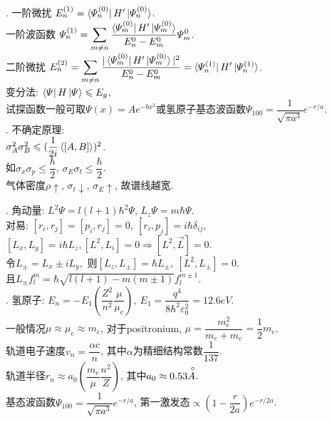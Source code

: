 \documentclass[12pt, 
]{article}
\begin{document}
. 一阶微扰 $E_n^{(1)}=\bra{\varPsi_n^{(0)}}H'\ket{\varPsi_n^{(0)}}$.
~\\\phantom{~~~~}一阶波函数 $\varPsi_n^{(1)}=\displaystyle\sum_{m\not = n}\dfrac{\bra{\varPsi_m^{(0)}}H'\ket{\varPsi_m^{(0)}}}{E_n^0-E_m^0}\varPsi_m^0$.
~\\\phantom{~~~~}二阶微扰 $E_n^{(2)}=\displaystyle\sum_{m\not = n}\dfrac{|\bra{\varPsi_m^{(0)}}H'\ket{\varPsi_m^{(0)}}|^2}{E_n^0-E_m^0}=\bra{\varPsi_n^{(1)}}H'\ket{\varPsi_n^{(1)}}$.
~\\\phantom{~~~~}变分法: $\bra{\varPsi}H\ket{\varPsi}\leqslant E_g$, 
~\\\phantom{~~~~}试探函数一般可取$\varPsi(x)=Ae^{-bx^2}$或氢原子基态波函数$\varPsi_{100}=\dfrac{1}{\sqrt{\pi a^3}}e^{-r/a}$.
~\\

. 不确定原理:
~\\\phantom{~~~~~~~~~~}$\sigma_A^2\sigma_B^2\leqslant(\dfrac{1}{2i}\braket{[A,B]})^2$.
~\\\phantom{~~~~~~~~~~}如$\sigma_x\sigma_p\leqslant\dfrac{\hbar}{2}$, $\sigma_E\sigma_t\leqslant\dfrac{\hbar}{2}$.
~\\\phantom{~~~~~~~~~~}气体密度$\rho\uparrow$, $\sigma_t\downarrow$, $\sigma_E\uparrow$, 故谱线越宽.
~\\

. 角动量: $L^2\varPsi=l(l+1)\hbar^2\varPsi$, $L_z\varPsi=m\hbar\varPsi$.
~\\\phantom{~~~~~}对易: $[r_i, r_j]=[p_i,r_j]=0,~[r_i, p_j]=i\hbar\delta_{ij}$,
~\\\phantom{~~~~~对易:~}$[L_x,L_y]=i\hbar L_z, [L^2, L_i]=0\Rightarrow[L^2,\vec{L}]=0$.
~\\\phantom{~~~~}令$L_\pm=L_x\pm iL_y,$ 则$[L_z,L_\pm]=\hbar L_\pm,~[L^2,L_\pm]=0$.
~\\\phantom{~~~~}且$L_\pm f_l^m=\hbar\sqrt{l(l+1)-m(m\pm1)}f_l^{m\pm 1}$.~\\

. 氢原子: $E_n=-E_1(\dfrac{Z^2}{n^2}\dfrac{\mu}{\mu_e}),~E_1=\dfrac{q^4}{8\hbar^2\varepsilon_0^2}=12.6eV$.
~\\\phantom{~~~~~}一般情况$\mu\approx\mu_e\approx m_e$, 对于positronium, $\mu=\dfrac{m_e^2}{m_e+m_e}=\dfrac{1}{2}m_e$.
~\\\phantom{~~~~~}轨道电子速度$v_n=\dfrac{\alpha c}{n}$, 其中$\alpha$为精细结构常数$\dfrac{1}{137}$.
~\\\phantom{~~~~~}轨道半径$r_n\approx a_0(\dfrac{m_e}{\mu}\dfrac{n^2}{Z})$, 其中$a_0\approx 0.53\overset{\hspace{0.1cm}\circ}{A}$.
~\\\phantom{~~~~}基态波函数$\varPsi_{100}=\dfrac{1}{\sqrt{\pi a^3}}e^{-r/a}$, 第一激发态$\propto (1-\dfrac{r}{2a})e^{-r/2a}$.
~\\
\end{document}
